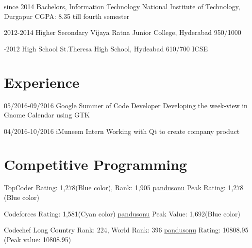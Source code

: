 \documentclass[]{friggeri-cv-a4}
\begin{document}
\begin{entrylist}

\entry
{since 2014}
{Bachelors, {\normalfont Information Technology}}
{National Institute of Technology, Durgapur}
{CGPA: 8.35 till fourth semester}
{}

\entry
{2012-2014}
{Higher Secondary}
{Vijaya Ratna Junior College, Hyderabad}
{950/1000}
{}

\entry
{-2012}
{High School}
{St.Theresa High School, Hydeabad}
{610/700 ICSE}
{}

\end{entrylist}


\section{\normalfont Experience}

\begin{entrylist}

\entry
{05/2016-09/2016}
{Google Summer of Code}
{Developer}
{Developing the week-view in Gnome Calendar using GTK}

\entry
{04/2016-10/2016}
{iMuneem}
{Intern}
{Working with Qt to create company product}

\end{entrylist}


\section{\normalfont Competitive Programming}

\begin{entrylist}

\entry
{TopCoder}
{Rating: 1,278(Blue color), Rank: 1,905}
{\href{https://www.topcoder.com/members/pandusonu/}{pandusonu}}
{Peak Rating: 1,278 (Blue color)}

\entry
{Codeforces}
{Rating: 1,581(Cyan color)}
{\href{http://codeforces.com/profile/pandusonu}{pandusonu}}
{Peak Value: 1,692(Blue color)}

\entry
{Codechef Long}
{Country Rank: 224, World Rank: 396}
{\href{http://www.codechef.com/users/pandusonu}{pandusonu}}
{Rating: 10808.95 (Peak value: 10808.95)}



\end{entrylist}
\end{document}
